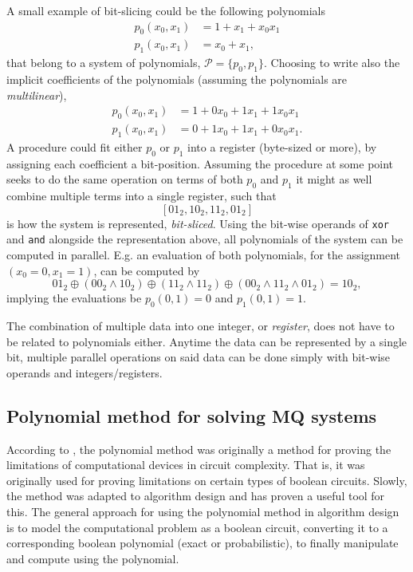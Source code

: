 A small example of bit-slicing could be the following polynomials
\begin{equation*}
    \begin{split}
        p_0(x_0, x_1) &= 1 + x_1 + x_0x_1\\
        p_1(x_0, x_1) &= x_0 + x_1,
    \end{split}
\end{equation*} 
that belong to a system of polynomials, $\mathcal{P} = \{p_0, p_1\}$. Choosing to write also the implicit coefficients of the polynomials (assuming the polynomials are \textit{multilinear}),
\begin{equation*}
    \begin{split}
        p_0(x_0, x_1) &= 1 + 0x_0 + 1x_1 + 1x_0x_1\\
        p_1(x_0, x_1) &= 0 + 1x_0 + 1x_1 + 0x_0x_1.
    \end{split}
\end{equation*} 
A procedure could fit either $p_0$ or $p_1$ into a register (byte-sized or more), by assigning each coefficient a bit-position. Assuming the procedure at some point seeks to do the same operation on terms of both $p_0$ and $p_1$ it might as well combine multiple terms into a single register, such that 
$$
    [01_2, 10_2, 11_2, 01_2]
$$
is how the system is represented, \textit{bit-sliced}. Using the bit-wise operands of \texttt{xor} and \texttt{and} alongside the representation above, all polynomials of the system can be computed in parallel. E.g. an evaluation of both polynomials, for the assignment $(x_0 = 0, x_1 = 1)$, can be computed by
\begin{equation*}
                01_2 \oplus (00_2 \wedge 10_2) \oplus (11_2 \wedge 11_2) \oplus (00_2 \wedge 11_2 \wedge 01_2) = 10_2,
\end{equation*}
implying the evaluations be $p_0(0,1) = 0$ and $p_1(0,1) = 1$.

The combination of multiple data into one integer, or \textit{register}, does not have to be related to polynomials either. Anytime the data can be represented by a single bit, multiple parallel operations on said data can be done simply with bit-wise operands and integers/registers.

\subsection{Polynomial method for solving MQ systems} \label{sec:prereq:polymethod}
According to \cite{Williams2014ThePM}, the polynomial method was originally a method for proving the limitations of computational devices in circuit complexity. That is, it was originally used for proving limitations on certain types of boolean circuits. Slowly, the method was adapted to algorithm design and has proven a useful tool for this. The general approach for using the polynomial method in algorithm design is to model the computational problem as a boolean circuit, converting it to a corresponding boolean polynomial (exact or probabilistic), to finally manipulate and compute using the polynomial. 

